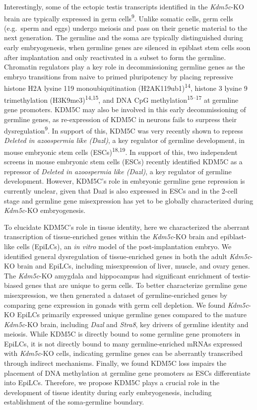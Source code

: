 \documentclass[
]{article}
\begin{document}
Interestingly, some of the ectopic testis transcripts identified in the
\emph{Kdm5c}-KO brain are typically expressed in germ
cells\textsuperscript{9}. Unlike somatic cells, germ cells (e.g.~sperm
and eggs) undergo meiosis and pass on their genetic material to the next
generation. The germline and the soma are typically distinguished during
early embryogenesis, when germline genes are silenced in epiblast stem
cells soon after implantation and only reactivated in a subset to form
the germline. Chromatin regulators play a key role in decommissioning
germline genes as the embryo transitions from naive to primed
pluripotency by placing repressive histone H2A lysine 119
monoubiquitination (H2AK119ub1)\textsuperscript{14}, histone 3 lysine 9
trimethylation (H3K9me3)\textsuperscript{14,15}, and DNA CpG
methylation\textsuperscript{15--17} at germline gene promoters. KDM5C
may also be involved in this early decommissioning of germline genes, as
re-expression of KDM5C in neurons fails to surpress their
dysregulation\textsuperscript{9}. In support of this, KDM5C was very
recently shown to repress \emph{Deleted in azoospermia like (Dazl)}, a
key regulator of germline development, in mouse embryonic stem cells
(ESCs)\textsuperscript{18,19}. In support of this, two independent
screens in mouse embryonic stem cells (ESCs) recently identified KDM5C
as a repressor of \emph{Deleted in azoospermia like (Dazl)}, a key
regulator of germline development. However, KDM5C's role in embryonic
germline gene repression is currently unclear, given that Dazl is also
expressed in ESCs and in the 2-cell stage and germline gene
misexpression has yet to be globally characterized during
\emph{Kdm5c}-KO embryogenesis.

To elucidate KDM5C's role in tissue identity, here we characterized the
aberrant transcription of tissue-enriched genes within the
\emph{Kdm5c}-KO brain and epiblast-like cells (EpiLCs), an \emph{in
vitro} model of the post-implantation embryo. We identified general
dysregulation of tissue-enriched genes in both the adult \emph{Kdm5c}-KO
brain and EpiLCs, including misexpression of liver, muscle, and ovary
genes. The \emph{Kdm5c}-KO amygdala and hippocampus had significant
enrichment of testis-biased genes that are unique to germ cells. To
better characterize germline gene misexpression, we then generated a
dataset of germline-enriched genes by comparing gene expression in
gonads with germ cell depletion. We found \emph{Kdm5c}-KO EpiLCs
primarily expressed unique germline genes compared to the mature
\emph{Kdm5c}-KO brain, including \emph{Dazl} and \emph{Stra8}, key
drivers of germline identity and meiosis. While KDM5C is directly bound
to some germline gene promoters in EpiLCs, it is not directly bound to
many germline-enriched mRNAs expressed with \emph{Kdm5c}-KO cells,
indicating germline genes can be aberrantly transcribed through indirect
mechanisms. Finally, we found KDM5C loss impairs the placement of DNA
methylation at germline gene promoters as ESCs differentiate into
EpiLCs. Therefore, we propose KDM5C plays a crucial role in the
development of tissue identity during early embryogenesis, including
establishment of the soma-germline boundary.
\end{document}

